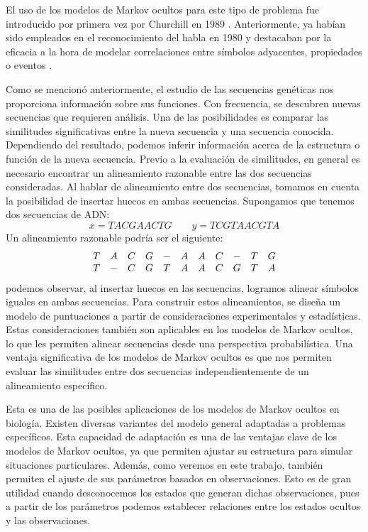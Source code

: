El uso de los modelos de Markov ocultos para este tipo de problema fue introducido por primera vez por Churchill en 1989 \cite{Churchill}. Anteriormente, ya habían sido empleados en el reconocimiento del habla en 1980 \cite{Ferguson} y destacaban por la eficacia a la hora de modelar correlaciones entre símbolos adyacentes, propiedades o eventos \cite{Rabiner}. 

Como se mencionó anteriormente, el estudio de las secuencias genéticas nos proporciona información sobre sus funciones. Con frecuencia, se descubren nuevas secuencias que requieren análisis. Una de las posibilidades es comparar las similitudes significativas entre la nueva secuencia y una secuencia conocida. Dependiendo del resultado, podemos inferir información acerca de la estructura o función de la nueva secuencia. Previo a la evaluación de similitudes, en general es necesario encontrar un alineamiento razonable entre las dos secuencias consideradas. Al hablar de alineamiento entre dos secuencias, tomamos en cuenta la posibilidad de insertar huecos en ambas secuencias. Supongamos que tenemos dos secuencias de ADN: 
\[x=TACGAACTG \qquad y=TCGTAACGTA\]
Un alineamiento razonable podría ser el siguiente:
\[\begin{array}{c c c c c c c c c c c}
    T& A& C& G& -& A& A& C& -& T& G \\
    T& -& C& G& T& A& A& C& G& T& A
\end{array}\]
podemos observar, al insertar huecos en las secuencias, logramos alinear símbolos iguales en ambas secuencias. Para construir estos alineamientos, se diseña un modelo de puntuaciones a partir de consideraciones experimentales y estadísticas. Estas consideraciones también son aplicables en los modelos de Markov ocultos, lo que les permiten alinear secuencias desde una perspectiva probabilística. Una ventaja significativa de los modelos de Markov ocultos es que nos permiten evaluar las similitudes entre dos secuencias independientemente de un alineamiento específico.

Esta es una de las posibles aplicaciones de los modelos de Markov ocultos en biología. Existen diversas variantes del modelo general adaptadas a problemas específicos. Esta capacidad de adaptación es una de las ventajas clave de los modelos de Markov ocultos, ya que permiten ajustar su estructura para simular situaciones particulares. Además, como veremos en este trabajo, también permiten el ajuste de sus parámetros basados en observaciones. Esto es de gran utilidad cuando desconocemos los estados que generan dichas observaciones, pues a partir de los parámetros podemos establecer relaciones entre los estados ocultos y las observaciones.

